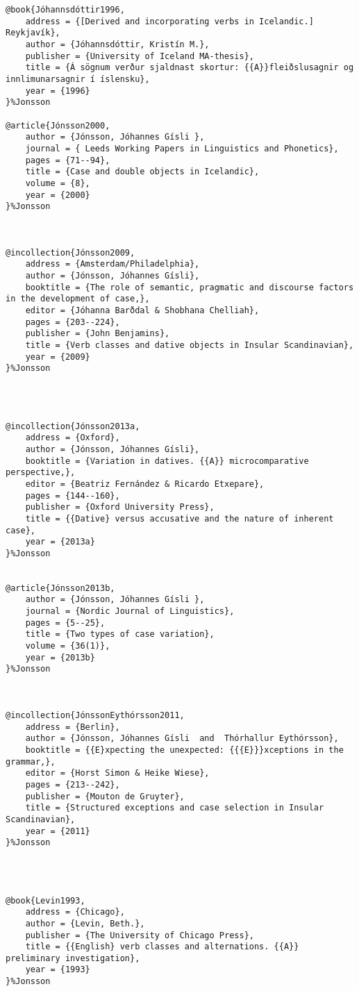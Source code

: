 \documentclass[output=paper,modfonts,nonflat]{langsci/langscibook}
\begin{document}
\begin{verbatim}
@book{Jóhannsdóttir1996,
	address = {[Derived and incorporating verbs in Icelandic.] Reykjavík},
	author = {Jóhannsdóttir, Kristín M.},
	publisher = {University of Iceland MA-thesis},
	title = {Á sögnum verður sjaldnast skortur: {{A}}fleiðslusagnir og innlimunarsagnir í íslensku},
	year = {1996}
}%Jonsson

@article{Jónsson2000,
	author = {Jónsson, Jóhannes Gísli },
	journal = { Leeds Working Papers in Linguistics and Phonetics},
	pages = {71--94},
	title = {Case and double objects in Icelandic},
	volume = {8},
	year = {2000}
}%Jonsson



@incollection{Jónsson2009,
	address = {Amsterdam/Philadelphia},
	author = {Jónsson, Jóhannes Gísli},
	booktitle = {The role of semantic, pragmatic and discourse factors in the development of case,},
	editor = {Jóhanna Barðdal & Shobhana Chelliah},
	pages = {203--224},
	publisher = {John Benjamins},
	title = {Verb classes and dative objects in Insular Scandinavian},
	year = {2009}
}%Jonsson




@incollection{Jónsson2013a,
	address = {Oxford},
	author = {Jónsson, Jóhannes Gísli},
	booktitle = {Variation in datives. {{A}} microcomparative perspective,},
	editor = {Beatriz Fernández & Ricardo Etxepare},
	pages = {144--160},
	publisher = {Oxford University Press},
	title = {{Dative} versus accusative and the nature of inherent case},
	year = {2013a}
}%Jonsson


@article{Jónsson2013b,
	author = {Jónsson, Jóhannes Gísli },
	journal = {Nordic Journal of Linguistics},
	pages = {5--25},
	title = {Two types of case variation},
	volume = {36(1)},
	year = {2013b}
}%Jonsson



@incollection{JónssonEythórsson2011,
	address = {Berlin},
	author = {Jónsson, Jóhannes Gísli  and  Thórhallur Eythórsson},
	booktitle = {{E}xpecting the unexpected: {{{E}}}xceptions in the grammar,},
	editor = {Horst Simon & Heike Wiese},
	pages = {213--242},
	publisher = {Mouton de Gruyter},
	title = {Structured exceptions and case selection in Insular Scandinavian},
	year = {2011}
}%Jonsson




@book{Levin1993,
	address = {Chicago},
	author = {Levin, Beth.},
	publisher = {The University of Chicago Press},
	title = {{English} verb classes and alternations. {{A}} preliminary investigation},
	year = {1993}
}%Jonsson





\end{verbatim}
\end{document}
